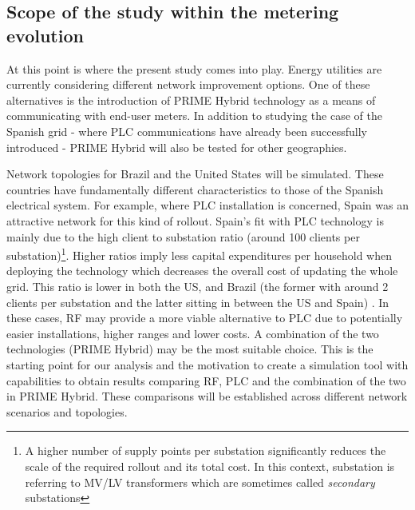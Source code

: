 \subsection{Scope of the study within the metering evolution}
At this point is where the present study comes into play. Energy utilities are currently considering different network improvement options. One of these alternatives is the introduction of PRIME Hybrid technology as a means of communicating with end-user meters. In addition to studying the case of the Spanish grid - where PLC communications have already been successfully introduced - PRIME Hybrid will also be tested for other geographies.

Network topologies for Brazil and the United States will be simulated. These countries have fundamentally different characteristics to those of the Spanish electrical system.  For example, where PLC installation is concerned, Spain was an attractive network for this kind of rollout. Spain's fit with PLC technology is mainly due to the high client to substation ratio (around 100 clients per substation)\footnote{A higher number of supply points per substation significantly reduces the scale of the required rollout and its total cost. In this context, substation is referring to MV/LV transformers which are sometimes called \textit{secondary} substations}. Higher ratios imply less capital expenditures per household when deploying the technology which decreases the overall cost of updating the whole grid. This ratio is lower in both the US, and Brazil (the former with around 2 clients per substation and the latter sitting in between the US and Spain) \cite{conversacion_nico_arcauz}. In these cases, RF may provide a  more viable alternative to PLC due to potentially easier installations, higher ranges and lower costs. A combination of the two technologies (PRIME Hybrid) may be the most suitable choice. This is the starting point for our analysis and the motivation to create a simulation tool with capabilities to obtain results comparing RF, PLC and the combination of the two in PRIME Hybrid. These comparisons will be established across different network scenarios and topologies.